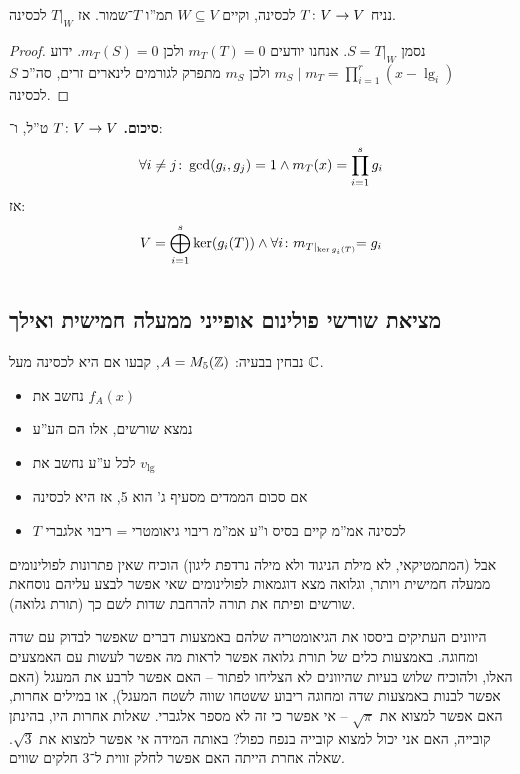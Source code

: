 \documentclass[name=רשימות אלגברה לינארית 2א]{../../../tex/classes/megasumPreamble}
\begin{document}
	\begin{Theorem}
		נניח $T \colon V \to V$ לכסינה, וקיים $W \subseteq V$ תמ''ו $T$־שמור. אז $T|_{W}$ לכסינה. 
	\end{Theorem}\begin{proof}
		נסמן $S = T|_{W}$. אנחנו יודעים $m_T(T) = 0$ ולכן $m_T(S) = 0$. ידוע $m_S \mid m_T = \prod_{i = 1}^{r}(x - \lg_i)$ ולכן $m_S$ מתפרק לגורמים לינארים זרים, סה''כ $S$ לכסינה. 
	\end{proof}
	
	\textbf{סיכום. }$T \colon V \to V$ ט''ל, ו־: 
	\[ \forall i \neq j \colon \gcd(g_i, g_j) =1 \land m_T(x) = \prod_{i = 1}^{s}g_i \]
	אז: 
	\[ V = \bigoplus_{i = 1}^{s} \ker(g_i(T)) \land \forall i \colon m_{T|_{\ker g_i(T)}} \!\!= g_i \]
	
	
	\npage	
	\section[צורת ג'ורדן]{}
	\subsection{מציאת שורשי פולינום אופייני ממעלה חמישית ואילך}
	נבחין בבעיה: $A = M_5(\mathbb{Z})$, קבעו אם היא לכסינה מעל $\mathbb{C}$. 
	\begin{itemize}
		\item נחשב את $f_A(x)$
		\item נמצא שורשים, אלו הם הע''ע
		\item לכל ע''ע נחשב את $v_\lg$
		\item אם סכום הממדים מסעיף ג' הוא 5, אז היא לכסינה
		\item $T$ לכסינה אמ''מ קיים בסיס ו''ע אמ''מ ריבוי גיאומטרי = ריבוי אלגברי
	\end{itemize}
	
	אבל (המתמטיקאי, לא מילת הניגוד ולא מילה נרדפת ליגון) הוכיח שאין פתרונות לפולינומים ממעלה חמישית ויותר, וגלואה מצא דוגמאות לפולינומים שאי אפשר לבצע עליהם נוסחאת שורשים ופיתח את תורה להרחבת שדות לשם כך (תורת גלואה). 
	
	היוונים העתיקים ביססו את הגיאומטריה שלהם באמצעות דברים שאפשר לבדוק עם שדה ומחוגה. באמצעות כלים של תורת גלואה אפשר לראות מה אפשר לעשות עם האמצעים האלו, ולהוכיח שלוש בעיות שהיוונים לא הצליחו לפתור – האם אפשר לרבע את המעגל (האם אפשר לבנות באמצעות שדה ומחוגה ריבוע ששטחו שווה לשטח המעגל), או במילים אחרות, האם אפשר למצוא את $\sqrt\pi$ – אי אפשר כי זה לא מספר אלגברי. שאלות אחרות היו, בהינתן קובייה, האם אני יכול למצוא קובייה בנפח כפול? באותה המידה אי אפשר למצוא את $\sqrt3$. שאלה אחרת הייתה האם אפשר לחלק זווית ל־3 חלקים שווים. 
	
\end{document}
